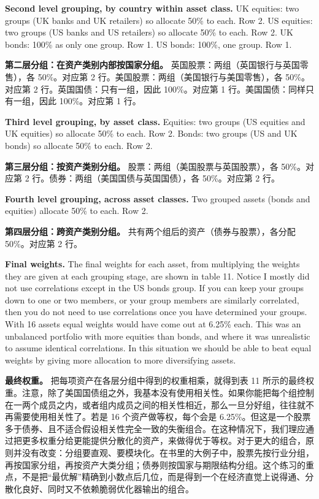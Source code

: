 \medskip \noindent\textbf{Second level grouping, by country within asset class.} UK equities: two groups (UK banks and UK retailers) so allocate 50\% to each. Row 2. US equities: two groups (US banks and US retailers) so allocate 50\% to each. Row 2. UK bonds: 100\% as only one group. Row 1. US bonds: 100\%, one group. Row 1.

\medskip \noindent\textbf{第二层分组：在资产类别内部按国家分组。} 英国股票：两组（英国银行与英国零售），各 50\%。对应第 2 行。美国股票：两组（美国银行与美国零售），各 50\%。对应第 2 行。英国国债：只有一组，因此 100\%。对应第 1 行。美国国债：同样只有一组，因此 100\%。对应第 1 行。

\medskip \noindent\textbf{Third level grouping, by asset class.} Equities: two groups (US equities and UK equities) so allocate 50\% to each. Row 2. Bonds: two groups (US and UK bonds) so allocate 50\% to each. Row 2.

\medskip \noindent\textbf{第三层分组：按资产类别分组。} 股票：两组（美国股票与英国股票），各 50\%。对应第 2 行。债券：两组（美国国债与英国国债），各 50\%。对应第 2 行。

\medskip \noindent\textbf{Fourth level grouping, across asset classes.} Two grouped assets (bonds and equities) allocate 50\% to each. Row 2.

\medskip \noindent\textbf{第四层分组：跨资产类别分组。} 共有两个组后的资产（债券与股票），各分配 50\%。对应第 2 行。

\medskip

\noindent\textbf{Final weights.} The final weights for each asset, from multiplying the weights they are given at each grouping stage, are shown in table 11. Notice I mostly did not use correlations except in the US bonds group. If you can keep your groups down to one or two members, or your group members are similarly correlated, then you do not need to use correlations once you have determined your groups. With 16 assets equal weights would have come out at 6.25\% each. This was an unbalanced portfolio with more equities than bonds, and where it was unrealistic to assume identical correlations. In this situation we should be able to beat equal weights by giving more allocation to more diversifying assets. \endgroup

\medskip

\begin{chineseblock} \noindent\textbf{最终权重。} 把每项资产在各层分组中得到的权重相乘，就得到表 11 所示的最终权重。注意，除了美国国债组之外，我基本没有使用相关性。如果你能把每个组控制在一两个成员之内，或者组内成员之间的相关性相近，那么一旦分好组，往往就不再需要使用相关性了。若是 16 个资产做等权，每个会是 6.25\%。但这是一个股票多于债券、且不适合假设相关性完全一致的失衡组合。在这种情况下，我们理应通过把更多权重分给更能提供分散化的资产，来做得优于等权。对于更大的组合，原则并没有改变：分组要直观、要模块化。在书里的大例子中，股票先按行业分组，再按国家分组，再按资产大类分组；债券则按国家与期限结构分组。这个练习的重点，不是把“最优解”精确到小数点后几位，而是得到一个在经济直觉上说得通、分散化良好、同时又不依赖脆弱优化器输出的组合。\end{chineseblock}

